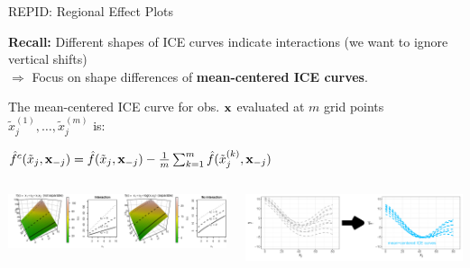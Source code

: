 \documentclass[11pt,compress,t,notes=noshow, aspectratio=169, xcolor=table,dvipsnames]{beamer}
\begin{document}
\begin{frame}{REPID: Regional Effect Plots }

\textbf{Recall:} Different shapes of ICE curves indicate interactions (we want to ignore vertical shifts)\\
$\Rightarrow$ Focus on shape differences of {\color{cice}\bfseries mean-centered ICE curves}.
    

The mean-centered ICE curve for obs. $\mathbf{x}$ evaluated at $m$ grid points $\tilde x_j^{(1)}, \dots, \tilde x_j^{(m)}$ is:

{\color{cice}
\centerline{$\hat f^c(\tilde x_j, \mathbf{x}_{-j}) = \hat{f}(\tilde x_j, \mathbf{x}_{-j}) - \frac{1}{m} \sum\nolimits_{k=1}^m \hat{f}(\tilde x_j^{(k)}, \mathbf{x}_{-j})$}}

\begin{columns}
    \begin{column}{0.39\textwidth}
        \includegraphics[width = \textwidth, trim={13cm 0cm 0cm 0cm}, clip]{figure/interaction_separable_2}
    \end{column}
    \begin{column}{0.61\textwidth}
        \includegraphics[width = \textwidth]{figure/ice_rep_distance0.png} 
    \end{column}
\end{columns}

\end{frame}
\end{document}
